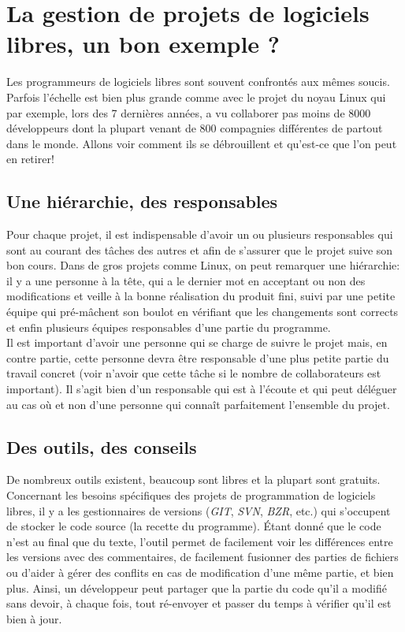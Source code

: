 \section*{La gestion de projets de logiciels libres, un bon exemple ?}
Les programmeurs de logiciels libres sont souvent confrontés aux mêmes soucis. Parfois l'échelle est bien plus grande comme avec le projet du noyau Linux qui par exemple, lors des 7 dernières années, a vu collaborer pas moins de 8000 développeurs dont la plupart venant de 800 compagnies différentes de partout dans le monde. Allons voir comment ils se débrouillent et qu'est-ce que l'on peut en retirer!

\subsection*{Une hiérarchie, des responsables}
Pour chaque projet, il est indispensable d'avoir un ou plusieurs responsables qui sont au courant des tâches des autres et afin de s'assurer que le projet suive son bon cours.
Dans de gros projets comme Linux, on peut remarquer une hiérarchie: il y a une personne à la tête, qui a le dernier mot en acceptant ou non des modifications et veille à la bonne réalisation du produit fini, suivi par une petite équipe qui pré-mâchent son boulot en vérifiant que les changements sont corrects et enfin plusieurs équipes responsables d'une partie du programme.\\

Il est important d'avoir une personne qui se charge de suivre le projet mais, en contre partie, cette personne devra être responsable d'une plus petite partie du travail concret (voir n'avoir que cette tâche si le nombre de collaborateurs est important). Il s'agit bien d'un responsable qui est à l'écoute et qui peut déléguer au cas où et non d'une personne qui connaît parfaitement l'ensemble du projet.

\subsection*{Des outils, des conseils}
De nombreux outils existent, beaucoup sont libres et la plupart sont gratuits.
Concernant les besoins spécifiques des projets de programmation de logiciels libres, il y a les gestionnaires de versions (\textit{GIT}, \textit{SVN}, \textit{BZR}, etc.) qui s'occupent de stocker le code source (la recette du programme). Étant donné que le code n'est au final que du texte, l'outil permet de facilement voir les différences entre les versions avec des commentaires, de facilement fusionner des parties de fichiers ou d'aider à gérer des conflits en cas de modification d'une même partie, et bien plus. Ainsi, un développeur peut partager que la partie du code qu'il a modifié sans devoir, à chaque fois, tout ré-envoyer et passer du temps à vérifier qu'il est bien à jour.\\

